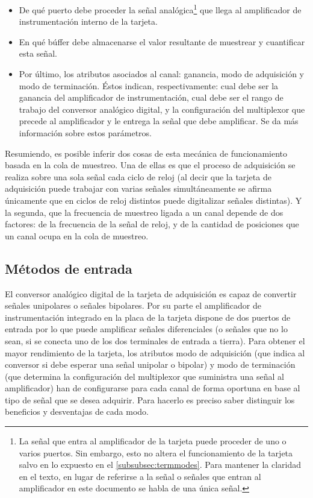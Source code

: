 \begin{itemize}
    \item De qué puerto debe proceder la señal analógica\footnote{La señal
	que entra al amplificador de la tarjeta puede proceder de uno o
	varios puertos. Sin embargo, esto no altera el funcionamiento de la
	tarjeta salvo en lo expuesto en  el \vref{subsubsec:termmodes}.
	Para mantener la claridad en el texto, en lugar de referirse a la
	señal o señales que entran al amplificador en este documento se
	habla de una única señal.} que llega al amplificador de
	instrumentación interno de la tarjeta.
    \item En qué búffer debe almacenarse el valor resultante de muestrear y
	cuantificar esta señal.
    \item Por último, los atributos asociados al canal: ganancia, modo de
	adquisición y modo de terminación. Éstos indican, respectivamente:
	cual debe ser la ganancia del amplificador de instrumentación, cual
	debe ser el rango de trabajo del conversor analógico digital, y la
	configuración del multiplexor que precede al amplificador y le
	entrega la señal que debe amplificar. Se da más información sobre
	estos parámetros.
\end{itemize}

Resumiendo, es posible inferir dos cosas de esta mecánica de funcionamiento
basada en la cola de muestreo. Una de ellas es que el proceso de
adquisición se realiza sobre una sola señal cada ciclo de reloj (al decir
que la tarjeta de adquisición puede trabajar con varias señales
simultáneamente se afirma únicamente que en ciclos de reloj distintos puede
digitalizar señales distintas). Y la segunda, que la frecuencia de muestreo
ligada a un canal depende de dos factores: de la frecuencia de la señal de
reloj, y de la cantidad de posiciones que un canal ocupa en la cola de
muestreo.


\subsection{Métodos de entrada}

El conversor analógico digital de la tarjeta de adquisición es capaz de
convertir señales unipolares o señales bipolares. Por su parte el
amplificador de instrumentación integrado en la placa de la tarjeta dispone
de dos puertos de entrada por lo que puede amplificar señales diferenciales
(o señales que no lo sean, si se conecta uno de los dos terminales de
entrada a tierra). Para obtener el mayor rendimiento de la tarjeta, los
atributos modo de adquisición (que indica al conversor si debe esperar una
señal unipolar o bipolar) y modo de terminación (que determina la
configuración del multiplexor que suministra una señal al amplificador) han
de configurarse para cada canal de forma oportuna en base al tipo de señal
que se desea adquirir. Para hacerlo es preciso saber distinguir los
beneficios y desventajas de cada modo.


